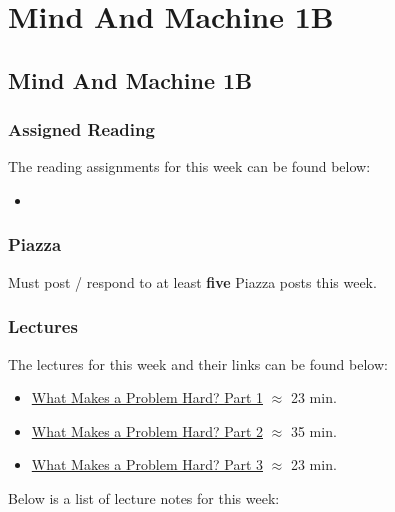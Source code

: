 \clearpage

\renewcommand{\ChapTitle}{Mind And Machine 1B}
\renewcommand{\SectionTitle}{Mind And Machine 1B}

\chapter{\ChapTitle}
\section{\SectionTitle}

\subsection{Assigned Reading}

The reading assignments for this week can be found below:

\begin{itemize}
    \item {}
\end{itemize}

\subsection{Piazza}

Must post / respond to at least \textbf{five} Piazza posts this week.  

\subsection{Lectures}

The lectures for this week and their links can be found below:

\begin{itemize}
    \item \href{https://applied.cs.colorado.edu/mod/hvp/view.php?id=49327}{What Makes a Problem Hard? Part 1} $\approx$ 23 min.
    \item \href{https://www.youtube.com/watch?v=3kRKoFurkyU}{What Makes a Problem Hard? Part 2} $\approx$ 35 min.
    \item \href{https://www.youtube.com/watch?v=LxVXcaE9aPM}{What Makes a Problem Hard? Part 3} $\approx$ 23 min.
\end{itemize}

\noindent Below is a list of lecture notes for this week:

